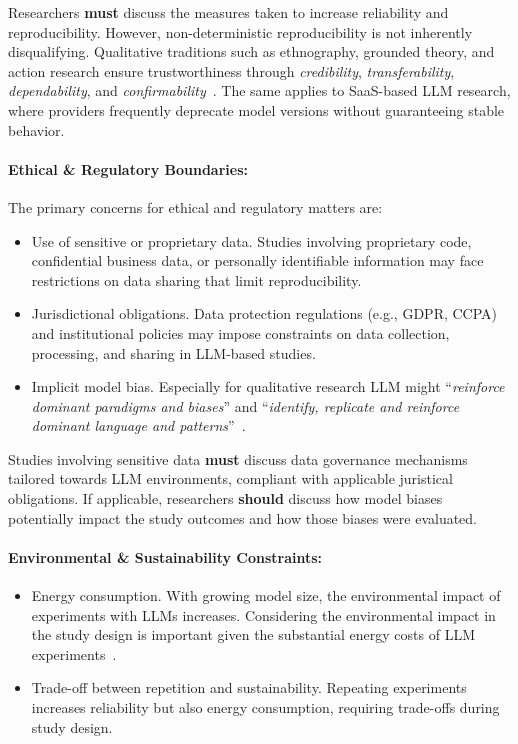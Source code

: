 \documentclass[smallextended]{svjour3}
\newcommand*{\enq}[1]{\enquote{{\itshape#1}}}
\newcommand{\must}{\textbf{must}\xspace}
\newcommand{\should}{\textbf{should}\xspace}
\begin{document}
Researchers \must discuss the measures taken to increase reliability and reproducibility.
However, non-deterministic reproducibility is not inherently disqualifying. Qualitative traditions such as ethnography, grounded theory, and action research ensure trustworthiness through \emph{credibility}, \emph{transferability}, \emph{dependability}, and \emph{confirmability}~\cite{guba1981criteria}.
The same applies to SaaS-based LLM research, where providers frequently deprecate model versions without guaranteeing stable behavior.

\paragraph{Ethical \& Regulatory Boundaries:}
The primary concerns for ethical and regulatory matters are:
\begin{itemize}
    \item Use of sensitive or proprietary data. Studies involving proprietary code, confidential business data, or personally identifiable information may face restrictions on data sharing that limit reproducibility.
    \item Jurisdictional obligations. Data protection regulations (e.g., GDPR, CCPA) and institutional policies may impose constraints on data collection, processing, and sharing in LLM-based studies.
    \item Implicit model bias. Especially for qualitative research LLM might \enq{reinforce dominant paradigms and biases} and \enq{identify, replicate and reinforce dominant language and patterns}~\cite{jowsey2025reject}.
\end{itemize}

Studies involving sensitive data \must discuss data governance mechanisms tailored towards LLM environments, compliant with applicable juristical obligations. If applicable, researchers \should discuss how model biases potentially impact the study outcomes and how those biases were evaluated.

\paragraph{Environmental \& Sustainability Constraints:}
\begin{itemize}
    \item Energy consumption. With growing model size, the environmental impact of experiments with LLMs increases. Considering the environmental impact in the study design is important given the substantial energy costs of LLM experiments~\cite{DBLP:conf/acl/StrubellGM19}.
    \item Trade-off between repetition and sustainability. Repeating experiments increases reliability but also energy consumption, requiring trade-offs during study design.
\end{itemize}
\end{document}
